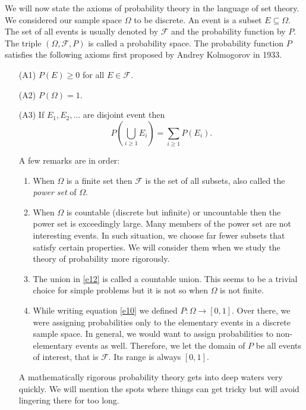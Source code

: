 \documentclass{article}
\begin{document}
We will now state the axioms of probability theory in the language of set
theory. We considered our sample space $\Omega$ to be discrete. An event
is a subset $E \subseteq \Omega$. The set of all events is usually denoted
by $\mathcal{F}$ and the probability function by $P$. The triple $(\Omega,
\mathcal{F}, P)$ is called a probability space. The probability function
$P$ satisfies the following axioms first proposed by Andrey Kolmogorov
in 1933.
\begin{enumerate}
\item[(A1)] $P(E) \ge 0$ for all $E \in \mathcal{F}$.
\item[(A2)] $P(\Omega) = 1$.
\item[(A3)] If $E_1, E_2, \ldots$ are disjoint event then
\begin{equation}\label{e12}
P\left(\bigcup_{i \ge 1} E_i\right) = \sum_{i \ge 1}P(E_i).
\end{equation}

A few remarks are in order:
\begin{enumerate}
\item When $\Omega$ is a finite set then $\mathcal{F}$ is the set of all
subsets, also called the \emph{power set} of $\Omega$.
\item When $\Omega$ is countable (discrete but infinite) or uncountable 
then the power set is exceedingly large. Many members of the power set are
not interesting events. In such situation, we choose far fewer subsets 
that satisfy certain properties. We will consider them when we study the
theory of probability more rigorously.
\item The union in \eqref{e12} is called a countable union. This seems to
be a trivial choice for simple problems but it is not so when $\Omega$ is
not finite.
\item While writing equation \eqref{e10} we defined $P: \Omega \rightarrow
[0, 1]$. Over there, we were assigning probabilities only to the elementary
events in a discrete sample space. In general, we would want to assign
probabilities to non-elementary events as well. Therefore, we let the domain
of $P$ be all events of interest, that is $\mathcal{F}$. Its range is 
always $[0, 1]$.
\end{enumerate}

A mathematically rigorous probability theory gets into deep waters very
quickly. We will mention the spots where things can get tricky but will
avoid lingering there for too long.


\end{enumerate}
\end{document}
